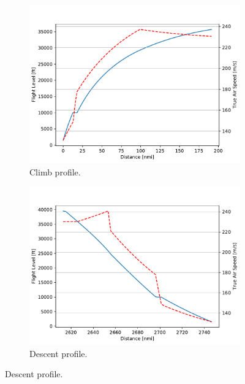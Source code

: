 \begin{figure}[!h]
	\centering
	\begin{subfigure}{0.45\textwidth}
		\centering
		\includegraphics[keepaspectratio, width=\linewidth]{images/chap2/FAST_base_climb_profile}
		\caption{Climb profile.}
		\label{fig:fast_base_climb}
	\end{subfigure}
	\hspace{10mm}
	\begin{subfigure}{0.45\textwidth}
		\centering
		\includegraphics[keepaspectratio, width=\linewidth]{images/chap2/FAST_base_descent_profile}
		\caption{Descent profile.}
		\label{fig:fast_base_descent}
	\end{subfigure}
	

\end{figure}
